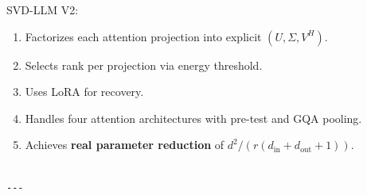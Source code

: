 SVD-LLM V2:
\begin{enumerate}
\item Factorizes each attention projection into explicit $(U, \Sigma, V^H)$.
\item Selects rank per projection via energy threshold.
\item Uses LoRA for recovery.
\item Handles four attention architectures with pre-test and GQA pooling.
\item Achieves \textbf{real parameter reduction} of $d^2 / (r(d_\text{in} + d_\text{out} + 1))$.
\end{enumerate}
\begin{lstlisting}

---
\end{lstlisting}